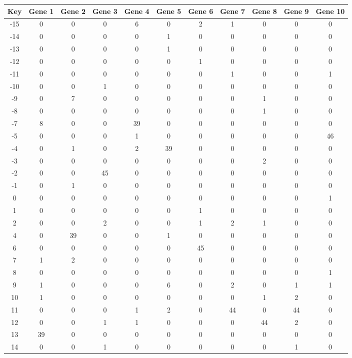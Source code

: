 \begin{tabular}{|c|c|c|c|c|c|c|c|c|c|c|}
\hline
Key & Gene 1 & Gene 2 & Gene 3 & Gene 4 & Gene 5 & Gene 6 & Gene 7 & Gene 8 & Gene 9 & Gene 10 \\
\hline
-15 & 0 & 0 & 0 & 6 & 0 & 2 & 1 & 0 & 0 & 0 \\
-14 & 0 & 0 & 0 & 0 & 1 & 0 & 0 & 0 & 0 & 0 \\
-13 & 0 & 0 & 0 & 0 & 1 & 0 & 0 & 0 & 0 & 0 \\
-12 & 0 & 0 & 0 & 0 & 0 & 1 & 0 & 0 & 0 & 0 \\
-11 & 0 & 0 & 0 & 0 & 0 & 0 & 1 & 0 & 0 & 1 \\
-10 & 0 & 0 & 1 & 0 & 0 & 0 & 0 & 0 & 0 & 0 \\
-9 & 0 & 7 & 0 & 0 & 0 & 0 & 0 & 1 & 0 & 0 \\
-8 & 0 & 0 & 0 & 0 & 0 & 0 & 0 & 1 & 0 & 0 \\
-7 & 8 & 0 & 0 & 39 & 0 & 0 & 0 & 0 & 0 & 0 \\
-5 & 0 & 0 & 0 & 1 & 0 & 0 & 0 & 0 & 0 & 46 \\
-4 & 0 & 1 & 0 & 2 & 39 & 0 & 0 & 0 & 0 & 0 \\
-3 & 0 & 0 & 0 & 0 & 0 & 0 & 0 & 2 & 0 & 0 \\
-2 & 0 & 0 & 45 & 0 & 0 & 0 & 0 & 0 & 0 & 0 \\
-1 & 0 & 1 & 0 & 0 & 0 & 0 & 0 & 0 & 0 & 0 \\
0 & 0 & 0 & 0 & 0 & 0 & 0 & 0 & 0 & 0 & 1 \\
1 & 0 & 0 & 0 & 0 & 0 & 1 & 0 & 0 & 0 & 0 \\
2 & 0 & 0 & 2 & 0 & 0 & 1 & 2 & 1 & 0 & 0 \\
4 & 0 & 39 & 0 & 0 & 1 & 0 & 0 & 0 & 0 & 0 \\
6 & 0 & 0 & 0 & 0 & 0 & 45 & 0 & 0 & 0 & 0 \\
7 & 1 & 2 & 0 & 0 & 0 & 0 & 0 & 0 & 0 & 0 \\
8 & 0 & 0 & 0 & 0 & 0 & 0 & 0 & 0 & 0 & 1 \\
9 & 1 & 0 & 0 & 0 & 6 & 0 & 2 & 0 & 1 & 1 \\
10 & 1 & 0 & 0 & 0 & 0 & 0 & 0 & 1 & 2 & 0 \\
11 & 0 & 0 & 0 & 1 & 2 & 0 & 44 & 0 & 44 & 0 \\
12 & 0 & 0 & 1 & 1 & 0 & 0 & 0 & 44 & 2 & 0 \\
13 & 39 & 0 & 0 & 0 & 0 & 0 & 0 & 0 & 0 & 0 \\
14 & 0 & 0 & 1 & 0 & 0 & 0 & 0 & 0 & 1 & 0 \\
\hline
\end{tabular}